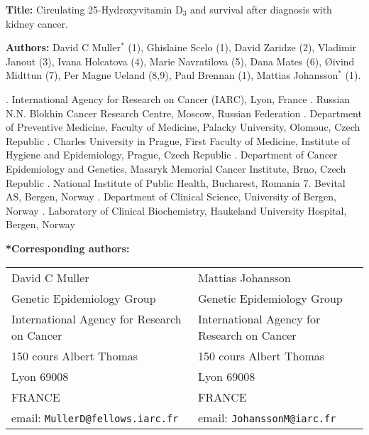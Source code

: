 \documentclass[a4paper,11pt]{article}
\begin{document}
\doublespace
\noindent \textbf{Title:} Circulating 25-Hydroxyvitamin D$_3$ and 
survival after diagnosis with kidney cancer. 

\noindent \textbf{Authors:} David C Muller$^*$ (1), Ghislaine Scelo (1),  David 
Zaridze (2), Vladimir Janout (3), Ivana Holcatova (4), Marie Navratilova (5), 
Dana Mates (6), {\O}ivind Midttun (7), Per Magne Ueland (8,9), Paul Brennan (1), 
Mattias Johansson$^*$  (1).

{\footnotesize 
{}. International Agency for Research on Cancer (IARC), Lyon, France . Russian N.N. Blokhin Cancer Research Centre, Moscow, Russian Federation 
. Department of Preventive Medicine, Faculty of Medicine, Palacky University, 
Olomouc, Czech Republic . Charles University in Prague, First Faculty of Medicine, Institute of 
Hygiene 
and Epidemiology, Prague, Czech Republic . Department of Cancer Epidemiology and Genetics, Masaryk Memorial Cancer 
Institute, Brno, Czech Republic . National Institute of Public Health, Bucharest, Romania
7. Bevital AS, Bergen, Norway . Department of Clinical Science, University of Bergen, Norway . Laboratory of Clinical Biochemistry, Haukeland University Hospital, Bergen, 
Norway
}

\noindent \textbf{*Corresponding authors:} 
\begin{table}[h!]
\begin{tabular}{ll}
David C Muller                  &      Mattias Johansson \\      
Genetic Epidemiology Group      &       Genetic Epidemiology Group  \\
International Agency for Research on Cancer & International Agency for Research on 
Cancer       \\
150 cours Albert Thomas         &  150 cours Albert Thomas      \\
Lyon 69008 &       Lyon 69008\\
FRANCE                     & FRANCE\\
email: \texttt{MullerD@fellows.iarc.fr} & 
email: \texttt{JohanssonM@iarc.fr}
\end{tabular}
\end{table}
\clearpage
\end{document}
